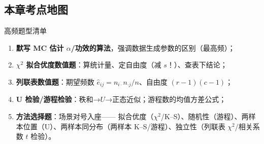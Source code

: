 \subsection{本章考点地图}

\begin{ebox}{高频题型清单}
\begin{enumerate}[leftmargin=2em]
  \item \textbf{默写 MC 估计 $\alpha$/功效的算法}，强调数据生成参数的区别（最高频）；
  \item \textbf{$\chi^2$ 拟合优度数值题}：算统计量、定自由度（减 $s$！）、查表下结论；
  \item \textbf{列联表数值题}：期望频数 $\hat e_{ij}=n_{i\cdot}n_{\cdot j}/n$、自由度 $(r-1)(c-1)$；
  \item \textbf{U 检验/游程检验}：秩和→$U$→正态近似；游程数的均值方差公式；
  \item \textbf{方法选择题}：场景对号入座——
  拟合优度（$\chi^2$/K--S）、随机性（游程）、两样本位置（U）、两样本同分布（两样本 K--S/游程）、独立性（列联表 $\chi^2$/相关系数 $t$ 检验）。
\end{enumerate}
\end{ebox}
